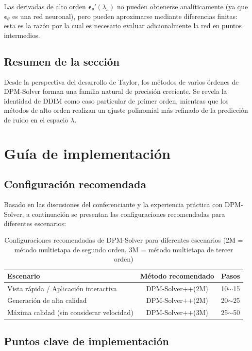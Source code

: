 \documentclass[a4paper]{article}
\begin{document}
Las derivadas de alto orden $\boldsymbol{\epsilon}_\theta'(\lambda_s)$ no pueden obtenerse analíticamente (ya que $\boldsymbol{\epsilon}_\theta$ es una red neuronal), pero pueden aproximarse mediante diferencias finitas: esta es la razón por la cual es necesario evaluar adicionalmente la red en puntos intermedios.

\subsection{Resumen de la sección}

Desde la perspectiva del desarrollo de Taylor, los métodos de varios órdenes de DPM-Solver forman una familia natural de precisión creciente. Se revela la identidad de DDIM como caso particular de primer orden, mientras que los métodos de alto orden realizan un ajuste polinomial más refinado de la predicción de ruido en el espacio $\lambda$.

\section{Guía de implementación}

\subsection{Configuración recomendada}

Basado en las discusiones del conferenciante y la experiencia práctica con DPM-Solver, a continuación se presentan las configuraciones recomendadas para diferentes escenarios:

\begin{table}[H]
\centering
\begin{tabular}{lcc}
\toprule
\textbf{Escenario} & \textbf{Método recomendado} & \textbf{Pasos} \\
\midrule
Vista rápida / Aplicación interactiva & DPM-Solver++(2M) & 10$\sim$15 \\
Generación de alta calidad & DPM-Solver++(2M) & 20$\sim$25 \\
Máxima calidad (sin considerar velocidad) & DPM-Solver++(3M) & 25$\sim$50 \\
\bottomrule
\end{tabular}
\caption{Configuraciones recomendadas de DPM-Solver para diferentes escenarios (2M = método multietapa de segundo orden, 3M = método multietapa de tercer orden)}
\end{table}

\subsection{Puntos clave de implementación}
\end{document}
